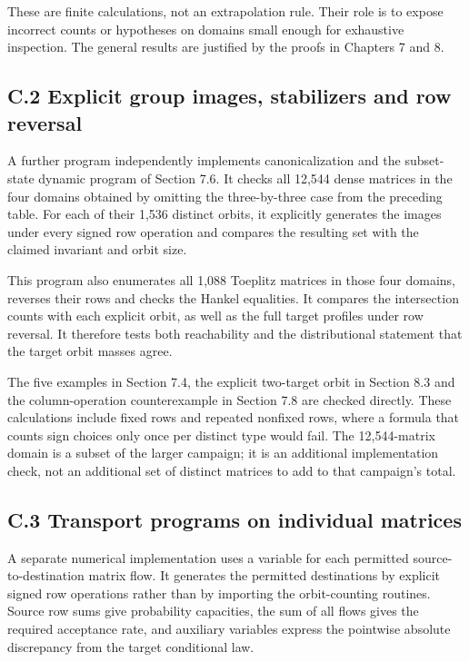 \documentclass[
]{article}
\begin{document}
These are finite calculations, not an extrapolation rule. Their role is
to expose incorrect counts or hypotheses on domains small enough for
exhaustive inspection. The general results are justified by the proofs
in Chapters 7 and 8.

\subsection{C.2 Explicit group images, stabilizers and row
reversal}\label{c.2-explicit-group-images-stabilizers-and-row-reversal}

A further program independently implements canonicalization and the
subset-state dynamic program of Section 7.6. It checks all 12,544 dense
matrices in the four domains obtained by omitting the three-by-three
case from the preceding table. For each of their 1,536 distinct orbits,
it explicitly generates the images under every signed row operation and
compares the resulting set with the claimed invariant and orbit size.

This program also enumerates all 1,088 Toeplitz matrices in those four
domains, reverses their rows and checks the Hankel equalities. It
compares the intersection counts with each explicit orbit, as well as
the full target profiles under row reversal. It therefore tests both
reachability and the distributional statement that the target orbit
masses agree.

The five examples in Section 7.4, the explicit two-target orbit in
Section 8.3 and the column-operation counterexample in Section 7.8 are
checked directly. These calculations include fixed rows and repeated
nonfixed rows, where a formula that counts sign choices only once per
distinct type would fail. The 12,544-matrix domain is a subset of the
larger campaign; it is an additional implementation check, not an
additional set of distinct matrices to add to that campaign's total.

\subsection{C.3 Transport programs on individual
matrices}\label{c.3-transport-programs-on-individual-matrices}

A separate numerical implementation uses a variable for each permitted
source-to-destination matrix flow. It generates the permitted
destinations by explicit signed row operations rather than by importing
the orbit-counting routines. Source row sums give probability
capacities, the sum of all flows gives the required acceptance rate, and
auxiliary variables express the pointwise absolute discrepancy from the
target conditional law.
\end{document}
